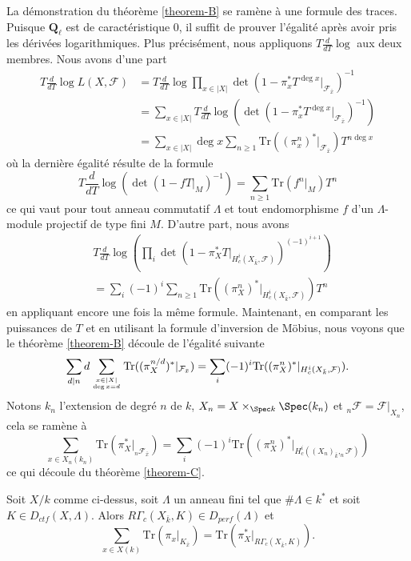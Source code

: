 \noindent
La démonstration du théorème \ref{theorem-B} se ramène à une formule des traces. Puisque
$\mathbf{Q}_\ell$ est de caractéristique 0, il suffit de prouver l'égalité après
avoir pris les dérivées logarithmiques. Plus précisément, nous appliquons $T\frac{d}{dT} \log$
aux deux membres. Nous avons d'une part
\begin{align*}
T \frac{d}{dT} \log L(X, \mathcal{F})
& =
T\frac{d}{dT} \log
\prod_{x \in |X|} \det(1 - \pi_x^* T^{\deg x} |_{\mathcal{F}_{\bar x}})^{-1} \\
& =
\sum_{x \in |X|} T \frac{d}{dT} \log
( \det(1 - \pi_x^* T^{\deg x} |_{\mathcal{F}_{\bar x}})^{-1}) \\
& =
\sum_{x \in |X|} \deg x
\sum_{n \geq 1} \text{Tr}((\pi_x^n)^* |_{\mathcal{F}_{\bar x}}) T^{n\deg x}
\end{align*}
où la dernière égalité résulte de la formule
$$
T\frac{d}{dT}\log\left(\det\left(1-fT|_M\right)^{-1}\right) = \sum_{n\geq 1}
\text{Tr}(f^n|_M)T^n
$$
ce qui vaut pour tout anneau commutatif $\Lambda$ et tout endomorphisme $f$ d'un
$\Lambda$-module projectif de type fini $M$. D'autre part, nous avons
\begin{align*}
& T\frac{d}{dT} \log\left(
\prod\nolimits_i
\det(1-\pi_X^*T |_{H_c^i\left(X_{\bar k} , \mathcal{F}\right)})^{(-1)^{i+1}}
\right) \\
& =
\sum\nolimits_i (-1)^i \sum\nolimits_{n \geq 1}
\text{Tr}\left((\pi_X^n)^* |_{H_c^i(X_{\bar k},\mathcal{F})}\right) T^n
\end{align*}
en appliquant encore une fois la même formule. Maintenant, en comparant les puissances de $T$ et en utilisant la
formule d'inversion de Möbius, nous voyons que le théorème \ref{theorem-B} découle de
l'égalité suivante
$$
\sum_{d | n} d \sum_{x \in |X| \atop \deg x = d}
\text{Tr}((\pi_X^{n/d})^* |_{\mathcal{F}_{\bar x}}) =
\sum_i (-1)^i \text{Tr}((\pi^n_X)^* |_{H^i_c(X_{\bar k}, \mathcal{F})}).
$$
Notons $k_n$ l'extension de degré $n$ de $k$,
$X_n = X \times_{\Spec k} \Spec(k_n)$ et
$_n\mathcal{F} = \mathcal{F}|_{X_n}$, cela se ramène
à
$$
\sum_{x \in X_n(k_n)} \text{Tr}(\pi_X^* |_{_n\mathcal{F}_{\bar x}})
=
\sum_i (-1)^i \text{Tr}((\pi^n_X)^* |_{H^i_c({(X_n)}_{\bar k}, _n\mathcal{F})})
$$
ce qui découle du théorème \ref{theorem-C}.



\begin{theorem}
\label{theorem-D}
Soit $X/k$ comme ci-dessus, soit $\Lambda$ un anneau fini tel que $\#\Lambda \in k^*$
et soit $K\in D_{ctf}(X, \Lambda)$. Alors $R\Gamma_c(X_{\bar k}, K)\in
D_{perf}(\Lambda)$ et
$$
\sum_{x\in X(k)}\text{Tr}\left(\pi_x |_{K_{\bar x}}\right) =
\text{Tr}\left(\pi_X^* |_{R\Gamma_c(X_{\bar k}, K )}\right).
$$
\end{theorem}

